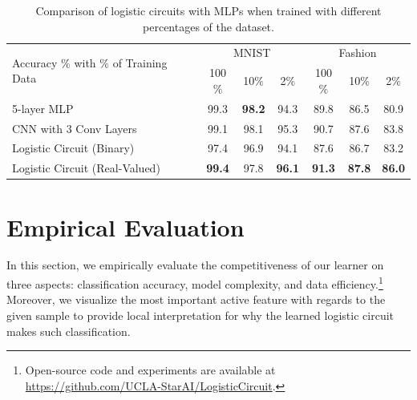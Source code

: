 \documentclass[letterpaper]{article} %
\begin{document}
   \begin{table}[tb]
          \caption{Comparison of logistic circuits with MLPs when trained with different percentages of the dataset.}
          \label{table: data efficiency}
          \centering
          {\fontsize{9}{9}\selectfont
          \begin{sc}
          \begin{tabular}{ @{}l c c c c c c@{} }
          \toprule
        \multirow{2}{*}{Accuracy $\%$  with $\%$ of Training Data }& \multicolumn{3}{c}{MNIST} & \multicolumn{3}{c}{Fashion}\\
	\cmidrule{2-4} \cmidrule{5-7}
	&100$\%$ & 10$\%$ & 2$\%$ & 100$\%$ & 10$\%$ & 2$\%$ \\
	          \midrule\midrule
	5-layer MLP & 99.3 & {\bf 98.2} &  94.3   & 89.8 & 86.5 & 80.9 \\
	CNN with 3 Conv Layers & 99.1 & 98.1 & 95.3 &90.7 & 87.6 & 83.8  \\
	\midrule
                   	Logistic Circuit (Binary) &  97.4 & 96.9 &  94.1 & 87.6 & 86.7 & 83.2 \\
         	Logistic Circuit (Real-Valued) &  {\bf 99.4} & 97.8 &  {\bf 96.1} & {\bf 91.3} & {\bf 87.8} & {\bf 86.0} \\
       		\bottomrule
		\end{tabular}
          \end{sc}
          }
   \end{table}

\section{Empirical Evaluation} \label{s:experiments}

In this section, we empirically evaluate the competitiveness of our learner on three aspects: classification accuracy, model complexity,  and data efficiency.\footnote{Open-source code and experiments are available at
\url{https://github.com/UCLA-StarAI/LogisticCircuit}.}
 Moreover, we visualize the most important active feature with regards to the given sample to provide local interpretation for why the learned logistic circuit makes such classification.
\end{document}
